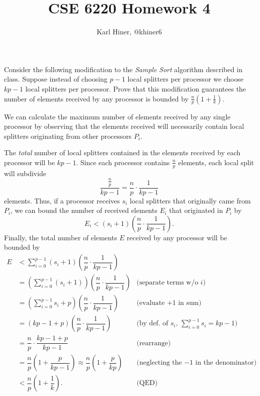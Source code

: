 \documentclass{article}
\begin{document}
\title{CSE 6220 Homework 4}
\author{Karl Hiner, @khiner6}
\date{}
\maketitle

\section{}
Consider the following modification to the \textit{Sample Sort} algorithm described in class.
Suppose instead of choosing $p - 1$ local splitters per processor we choose $kp - 1$ local splitters per processor.
Prove that this modification guarantees the number of elements received by any processor is bounded by $\frac{n}{p}\left(1 + \frac{1}{k}\right)$.

\quad We can calculate the maximum number of elements received by any single processor by observing that the elements received will necessarily contain local splitters originating from other processors $P_i$.

The \textit{total} number of local splitters contained in the elements received by each processor will be $kp - 1$.
Since each processor contains $\frac{n}{p}$ elements, each local split will subdivide
$$\dfrac{\frac{n}{p}}{kp - 1} = \dfrac{n}{p}\cdot\dfrac{1}{kp - 1}$$
elements.
Thus, if a processor receives $s_i$ local splitters that originally came from $P_i$, we can bound the number of received elements $E_i$ that originated in $P_i$ by
$$E_i < \left(s_i + 1\right)\left(\dfrac{n}{p}\cdot\dfrac{1}{kp - 1}\right).$$ 
Finally, the total number of elements $E$ received by any processor will be bounded by
\begin{align*}
  E &< \sum\limits_{i=0}^{p-1}\left(s_i + 1\right)\left(\dfrac{n}{p}\cdot\dfrac{1}{kp - 1}\right)\\
  &= \left(\sum\limits_{i=0}^{p-1}\left(s_i + 1\right)\right)\left(\dfrac{n}{p}\cdot\dfrac{1}{kp - 1}\right)&\text{(separate terms w/o $i$)}\\
  &= \left(\sum\limits_{i=0}^{p-1}s_i + p\right)\left(\dfrac{n}{p}\cdot\dfrac{1}{kp - 1}\right)&\text{(evaluate $+ 1$ in sum)}\\
  &= \left(kp - 1 + p\right)\left(\dfrac{n}{p}\cdot\dfrac{1}{kp - 1}\right)&\text{(by def. of $s_i$, $\sum\limits_{i = 0}^{p - 1}{s_i} = kp - 1$)}\\
  &= \dfrac{n}{p}\cdot\dfrac{kp - 1 + p}{kp - 1}&\text{(rearrange)}\\
  &= \dfrac{n}{p}\left(1 + \dfrac{p}{kp - 1}\right) \approx \dfrac{n}{p}\left(1 + \dfrac{p}{kp}\right) &\text{(neglecting the $-1$ in the denominator)}\\
  &< \dfrac{n}{p}\left(1+\dfrac{1}{k}\right).&\text{(QED)}
\end{align*}
\end{document}
